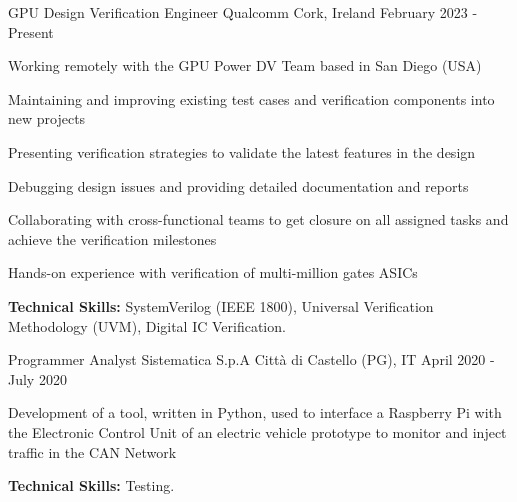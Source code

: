 

\begin{cventries}

  \cventry
    {GPU Design Verification Engineer} %
    {Qualcomm} %
    {Cork, Ireland} %
    {February 2023 - Present} %
    {
      \begin{cvitems} %
        \item {Working remotely with the GPU Power DV Team based in San Diego (USA)}
        \item {Maintaining and improving existing test cases and verification components into new projects}
        \item {Presenting verification strategies to validate the latest features in the design}
        \item {Debugging design issues and providing detailed documentation and reports}
        \item {Collaborating with cross-functional teams to get closure on all assigned tasks and achieve the verification milestones}
        \item {Hands-on experience with verification of multi-million gates ASICs}
        \item {\textbf{Technical Skills:} SystemVerilog (IEEE 1800), Universal Verification Methodology (UVM), Digital IC Verification.}
      \end{cvitems}
    }

  \cventry
    {Programmer Analyst} %
    {Sistematica S.p.A} %
    {Città di Castello (PG), IT} %
    {April 2020 - July 2020} %
    {
      \begin{cvitems} %
        \item {Development of a tool, written in Python, used to interface a Raspberry Pi with the Electronic Control Unit of an electric vehicle prototype to monitor and inject traffic in the CAN Network}
        \item {\textbf{Technical Skills:} Testing.}
      \end{cvitems}
    }


\end{cventries}
